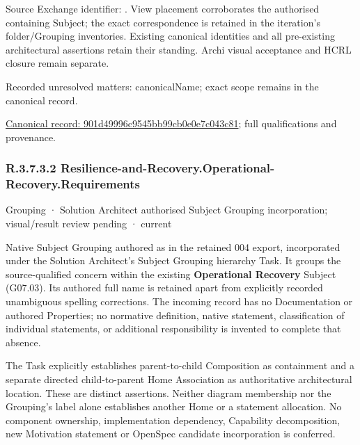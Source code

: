 Source Exchange identifier: \texttt{}. View placement corroborates
the authorised containing Subject; the exact correspondence is retained in the
iteration's folder/Grouping inventories. Existing canonical identities and all
pre-existing architectural assertions retain their standing. Archi visual
acceptance and HCRL closure remain separate.


{\small Recorded unresolved matters: canonicalName; exact scope remains in the canonical record.}\par
{\footnotesize \href{../../../../continuum/grouping/901d49996c9545bb99cb0e0e7c043c81.md}{Canonical record: 901d49996c9545bb99cb0e0e7c043c81}; full qualifications and provenance.}\par
\subsubsection*{R.3.7.3.2 Resilience-and-Recovery.Operational-Recovery.Requirements}
\label{navigation:R.3.7.3.2}

\label{element:1a235d13959e477ea52e0f201215fbe9}
{\small Grouping · Solution Architect authorised Subject Grouping incorporation; visual/result review pending · current}\par

Native Subject Grouping authored as \texttt{} in the retained 004 export,
incorporated under the Solution Architect's Subject Grouping hierarchy Task.
It groups the source-qualified \texttt{} concern within
the existing \textbf{Operational Recovery} Subject (G07.03). Its authored full name
is retained apart from explicitly recorded unambiguous spelling corrections.
The incoming record has no Documentation or authored Properties; no normative
definition, native statement, classification of individual statements, or
additional responsibility is invented to complete that absence.



The Task explicitly establishes parent-to-child Composition as containment and
a separate directed child-to-parent Home Association as authoritative architectural
location. These are distinct assertions. Neither diagram membership nor the
Grouping's label alone establishes another Home or a statement allocation.
No component ownership, implementation dependency, Capability decomposition,
new Motivation statement or OpenSpec candidate incorporation is conferred.



